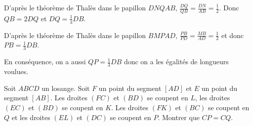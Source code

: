 \begin{sol}
\begin{center}
\end{center}

D'après le théorème de Thalès dans le papillon $DNQAB$, $\frac{DQ}{QB}=\frac{DN}{AB}=\frac1{2}$. Donc $QB=2DQ$ et $DQ=\frac1{3}DB$.

D'après le théorème de Thalès dans le papillon $BMPAD$, $\frac{PB}{PD}=\frac{MB}{AD}=\frac1{2}$ et donc $PB=\frac1{3}DB$.

En conséquence, on a aussi $QP=\frac1{3}DB$ donc on a les égalités de longueurs voulues.

\end{sol}

\begin{exo}
Soit $ABCD$ un losange. Soit $F$ un point du segment $[AD]$ et $E$ un point du segment $[AB]$. Les droites $(FC)$ et $(BD)$ se coupent en $L$, les droites $(EC)$ et $(BD)$ se coupent en $K$. Les droites $(FK)$ et $(BC)$ se coupent en $Q$ et les droites $(EL)$ et $(DC)$ se coupent en $P$. Montrer que $CP=CQ$.
\end{exo}

